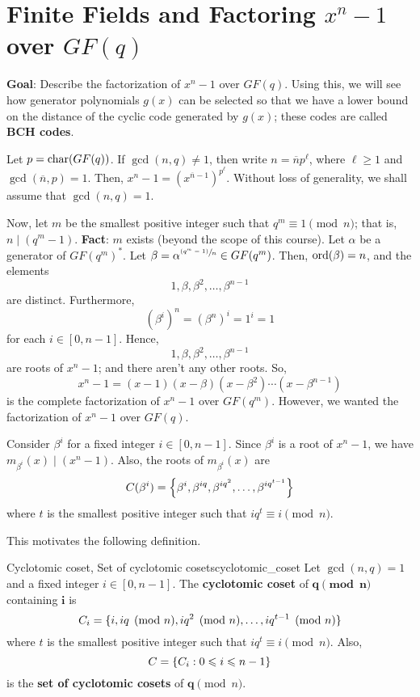 \section{Finite Fields and Factoring \texorpdfstring{$ x^n-1 $}{xⁿ-1}
  over \texorpdfstring{$ GF(q) $}{GF(q)}}
\textbf{Goal}: Describe the factorization of
$ x^n-1 $ over $ GF(q) $. Using this, we will see how
generator polynomials $ g(x) $ can be selected so that we have a
lower bound on the distance of the cyclic code
generated by $ g(x) $; these codes are called \textbf{BCH codes}.

Let $ p=\ch(GF(q)) $. If $ \gcd(n,q)\neq 1 $, then
write $ n=\overline{n}p^\ell $, where $ \ell\geqslant 1 $
and $ \gcd(\overline{n},p)=1 $. Then, $ x^n-1=(x^{\overline{n}-1})^{p^\ell} $.
Without loss of generality, we shall assume that $ \gcd(n,q)=1 $.

Now, let $ m $ be the smallest positive integer such that
$ q^m\equiv 1\pmod{n} $; that is, $ n\mid (q^m-1) $.
\textbf{Fact}: $ m $ exists (beyond the scope of this course).
Let $ \alpha $ be a generator of $ GF(q^m)^* $.
Let $ \beta=\alpha^{\sfrac{(q^m-1)}{n}} \in GF(q^m) $.
Then, $ \ord(\beta)=n $, and the elements
\[ 1,\beta,\beta^2,\ldots ,\beta^{n-1} \]
are distinct. Furthermore,
\[ (\beta^i)^n=(\beta^n)^i=1^i=1 \]
for each $ i\in[0,n-1] $. Hence,
\[ 1,\beta,\beta^2,\ldots ,\beta^{n-1} \]
are roots of $ x^n-1 $; and there aren't any other roots. So,
\[ x^n-1=(x-1)(x-\beta)(x-\beta^2)\cdots(x-\beta^{n-1}) \]
is the complete factorization of $ x^n-1 $ over $ GF(q^m) $.
However, we wanted the factorization of $ x^n-1 $ over $ GF(q) $.

Consider $ \beta^i $ for a fixed integer $ i\in[0,n-1] $. Since
$ \beta^i $ is a root of $ x^n-1 $, we have $ m_{\beta^i}(x)\mid (x^n-1) $.
Also, the roots of $ m_{\beta^i}(x) $ are
\[ C(\beta^i)=\set*{\beta^i,\beta^{iq},\beta^{iq^2},\ldots ,\beta^{iq^{t-1}}} \]
where $ t $ is the smallest positive integer such that $ iq^t\equiv i\pmod{n} $.

This motivates the following definition.

\begin{Definition}{Cyclotomic coset, Set of cyclotomic cosets}{cyclotomic_coset}
    Let $ \gcd(n,q)=1 $ and a fixed integer $ i\in[0,n-1] $. The
    \textbf{cyclotomic coset} of $\symbf{q\pmod{n}}$
    containing $\symbf{i}$ is
    \[ C_i=\set{i,iq\pmod{n},iq^2\pmod{n},\ldots ,iq^{t-1}\pmod{n}} \]
    where $ t $ is the smallest positive integer such that $ iq^t\equiv i\pmod{n} $.
    Also,
    \[ C=\set{C_i:0\leqslant i\leqslant n-1} \]
    is the \textbf{set of cyclotomic cosets} of $\symbf{q}\pmod{n}$.
\end{Definition}



